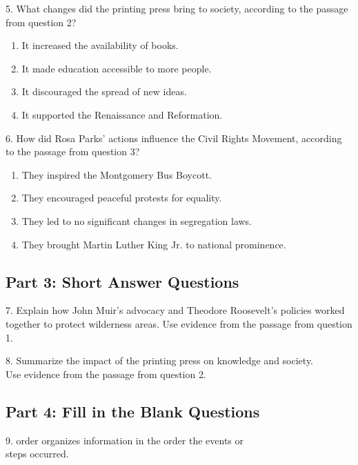 \documentclass[12pt]{article}
\begin{document}
\vspace{1cm}

5. What changes did the printing press bring to society, according to the passage from question 2?\\
\begin{enumerate}[label=\Alph*.]
    \item It increased the availability of books.  
    \item It made education accessible to more people.  
    \item It discouraged the spread of new ideas.  
    \item It supported the Renaissance and Reformation.  
\end{enumerate}

\vspace{1cm}

6. How did Rosa Parks’ actions influence the Civil Rights Movement, according to the passage from question 3?\\
\begin{enumerate}[label=\Alph*.]
    \item They inspired the Montgomery Bus Boycott.  
    \item They encouraged peaceful protests for equality.  
    \item They led to no significant changes in segregation laws.  
    \item They brought Martin Luther King Jr. to national prominence.  
\end{enumerate}

\vspace{1cm}

\subsection*{Part 3: Short Answer Questions}

7. Explain how John Muir’s advocacy and Theodore Roosevelt’s policies worked \\together to protect wilderness areas. Use evidence from the passage from question 1.\\
\vspace{4cm}

8. Summarize the impact of the printing press on knowledge and society. \\Use evidence from the passage from question 2.\\
\vspace{4cm}

\subsection*{Part 4: Fill in the Blank Questions}
\vspace{1cm}
9.  \underline{\hspace{4cm}} order organizes information in the order the events or \\steps occurred.
\end{document}
